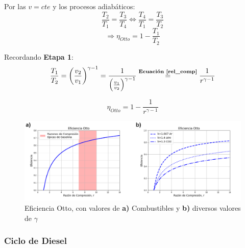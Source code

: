             Por las \(v=cte\) y los procesos adiabáticos:
            \[\frac{T_{2}}{T_{1}}=\frac{T_{3}}{T_{4}} \Leftrightarrow \frac{T_{4}}{T_{1}}=\frac{T_{3}}{T_{2}}\]
            \[\Rightarrow \eta_{Otto}=1-\frac{T_{1}}{T_{2}}\]
            
            Recordando \textbf{Etapa 1}:
            \[\frac{T_{1}}{T_{2}}=\left ( \frac{v_{2}}{v_{1}} \right)^{\gamma - 1}=\frac{1}{\left ( \frac{v_{1}}{v_{2}} \right)^{\gamma - 1}} \overset{\text{\textbf{Ecuación \ref{rel_comp}}}}{=} \frac{1}{r^{\gamma -1}}\]
            
            \begin{equation}
            \label{eficiencia_otto}
                \eta_{Otto}=1-\frac{1}{r^{\gamma -1}}
            \end{equation}
        
        \begin{figure}
            \centering
            \includegraphics[width=\textwidth]{img/graficos/ef_otto.png}
            \caption[Eficiencia Otto]{Eficiencia Otto, con valores de \textbf{a)} Combustibles y \textbf{b)} diversos valores de \(\gamma\)}
            \label{fig:eff_otto}
        \end{figure}
            
        \subsubsection{Ciclo de Diesel}
        
            

